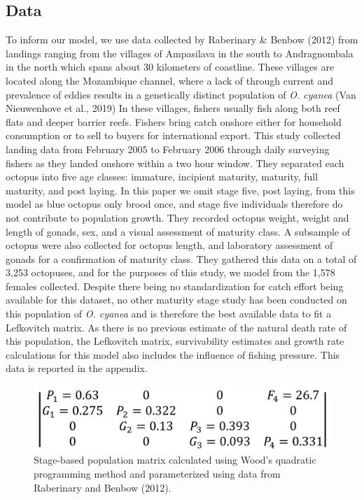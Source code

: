 \documentclass[
]{article}
\begin{document}
\hypertarget{data}{%
\subsection{Data}\label{data}}

To inform our model, we use data collected by Raberinary \& Benbow (2012) from landings ranging from the villages of Ampasilava in the south to Andragnombala in the north which spans about 30 kilometers of coastline. These villages are located along the Mozambique channel, where a lack of through current and prevalence of eddies results in a genetically distinct population of \emph{O. cyanea} (Van Nieuwenhove et al., 2019) In these villages, fishers usually fish along both reef flats and deeper barrier reefs. Fishers bring catch onshore either for household consumption or to sell to buyers for international export. This study collected landing data from February 2005 to February 2006 through daily surveying fishers as they landed onshore within a two hour window. They separated each octopus into five age classes: immature, incipient maturity, maturity, full maturity, and post laying. In this paper we omit stage five, post laying, from this model as blue octopus only brood once, and stage five individuals therefore do not contribute to population growth. They recorded octopus weight, weight and length of gonads, sex, and a visual assessment of maturity class. A subsample of octopus were also collected for octopus length, and laboratory assessment of gonads for a confirmation of maturity class. They gathered this data on a total of 3,253 octopuses, and for the purposes of this study, we model from the 1,578 females collected. Despite there being no standardization for catch effort being available for this dataset, no other maturity stage study has been conducted on this population of \emph{O. cyanea} and is therefore the best available data to fit a Lefkovitch matrix. As there is no previous estimate of the natural death rate of this population, the Lefkovitch matrix, survivability estimates and growth rate calculations for this model also includes the influence of fishing pressure. This data is reported in the appendix.

\begin{figure}
\includegraphics[width=1\linewidth]{MtxFilled} \caption{Stage-based population matrix calculated using Wood's quadratic programming method and parameterized using data from Raberinary and Benbow (2012). \label{WriteMtxRounded}}\label{fig:WriteMtxRounded}
\end{figure}
\end{document}

